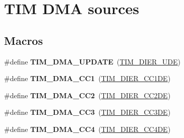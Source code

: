 \hypertarget{group___t_i_m___d_m_a__sources}{}\section{T\+IM D\+MA sources}
\label{group___t_i_m___d_m_a__sources}
\subsection*{Macros}
\begin{DoxyCompactItemize}
\item 
\mbox{\label{group___t_i_m___d_m_a__sources_ga45816ad15a4f533027eb202ac0b9aaf5}} 
\#define {\bfseries T\+I\+M\+\_\+\+D\+M\+A\+\_\+\+U\+P\+D\+A\+TE}~(\mbox{\hyperlink{group___peripheral___registers___bits___definition_gab9f47792b1c2f123464a2955f445c811}{T\+I\+M\+\_\+\+D\+I\+E\+R\+\_\+\+U\+DE}})
\item 
\mbox{\label{group___t_i_m___d_m_a__sources_ga33b93e8bb82fe8e167b9e9c962c54f83}} 
\#define {\bfseries T\+I\+M\+\_\+\+D\+M\+A\+\_\+\+C\+C1}~(\mbox{\hyperlink{group___peripheral___registers___bits___definition_gae181bb16ec916aba8ba86f58f745fdfd}{T\+I\+M\+\_\+\+D\+I\+E\+R\+\_\+\+C\+C1\+DE}})
\item 
\mbox{\label{group___t_i_m___d_m_a__sources_ga792f73196a8e7424655592097d7a3fd5}} 
\#define {\bfseries T\+I\+M\+\_\+\+D\+M\+A\+\_\+\+C\+C2}~(\mbox{\hyperlink{group___peripheral___registers___bits___definition_ga58f97064991095b28c91028ca3cca28e}{T\+I\+M\+\_\+\+D\+I\+E\+R\+\_\+\+C\+C2\+DE}})
\item 
\mbox{\label{group___t_i_m___d_m_a__sources_ga3eb2dadbd3109bced45935fb53deeee1}} 
\#define {\bfseries T\+I\+M\+\_\+\+D\+M\+A\+\_\+\+C\+C3}~(\mbox{\hyperlink{group___peripheral___registers___bits___definition_ga1567bff5dc0564b26a8b3cff1f0fe0a4}{T\+I\+M\+\_\+\+D\+I\+E\+R\+\_\+\+C\+C3\+DE}})
\item 
\mbox{\label{group___t_i_m___d_m_a__sources_ga59495cf79894dfe5e5b2029863aed956}} 
\#define {\bfseries T\+I\+M\+\_\+\+D\+M\+A\+\_\+\+C\+C4}~(\mbox{\hyperlink{group___peripheral___registers___bits___definition_gaaba034412c54fa07024e516492748614}{T\+I\+M\+\_\+\+D\+I\+E\+R\+\_\+\+C\+C4\+DE}})

\end{DoxyCompactItemize}
